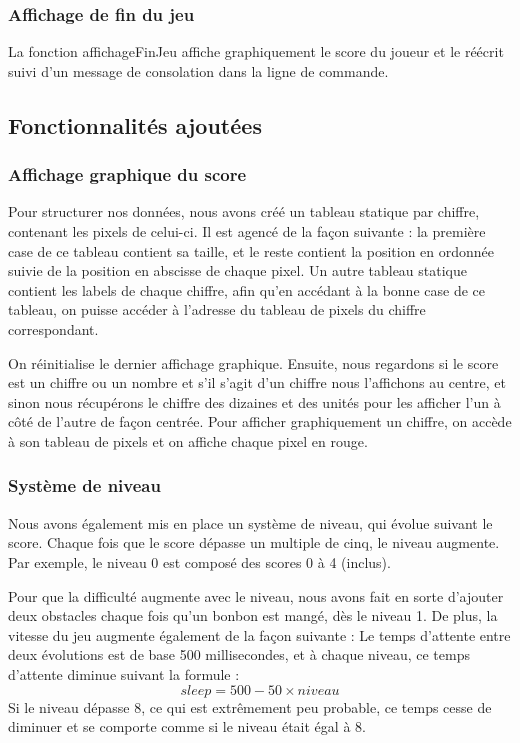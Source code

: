 \documentclass[a4paper]{article}
\begin{document}
\subsubsection*{Affichage de fin du jeu}
La fonction affichageFinJeu affiche graphiquement le score du joueur et le réécrit suivi d'un message de consolation dans la ligne de commande.

\subsection{Fonctionnalités ajoutées}

\subsubsection*{Affichage graphique du score}
Pour structurer nos données, nous avons créé un tableau statique par chiffre, contenant les pixels de celui-ci. Il est agencé de la façon suivante : la première case de ce 
tableau contient sa taille, et le reste contient la position en ordonnée suivie de la position en abscisse de chaque pixel.
Un autre tableau statique contient les labels de chaque chiffre, afin qu'en accédant à la bonne case de ce tableau, on puisse accéder à l'adresse du tableau de pixels du 
chiffre correspondant.

On réinitialise le dernier affichage graphique. Ensuite, nous regardons si le score est un chiffre ou un nombre et s'il s'agit d'un chiffre nous l'affichons au centre, 
et sinon nous récupérons le chiffre des dizaines et des unités pour les afficher l'un à côté de l'autre de façon centrée.
Pour afficher graphiquement un chiffre, on accède à son tableau de pixels et on affiche chaque pixel en rouge.

\subsubsection*{Système de niveau}
Nous avons également mis en place un système de niveau, qui évolue suivant le score. Chaque fois que le score dépasse un multiple de cinq, le niveau augmente. Par exemple, 
le niveau 0 est composé des scores 0 à 4 (inclus).

Pour que la difficulté augmente avec le niveau, nous avons fait en sorte d'ajouter deux obstacles chaque fois qu'un bonbon est mangé, dès le niveau 1. De plus, la vitesse 
du jeu augmente également de la façon suivante : Le temps d'attente entre deux évolutions est de base 500 millisecondes, et à chaque niveau, ce temps d'attente diminue 
suivant la formule :
\[sleep = 500-50\times niveau\]
Si le niveau dépasse 8, ce qui est extrêmement peu probable, ce temps cesse de diminuer et se comporte comme si le niveau était égal à 8.
\end{document}
